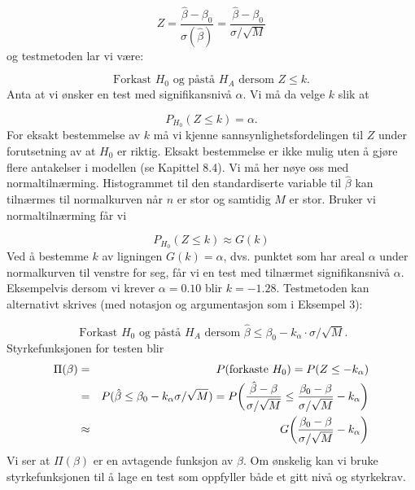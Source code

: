 \[ Z=\frac{\hat{\beta}-{\beta}_0}{\sigma (\hat{\beta})}=
              \frac{\hat{\beta}-{\beta}_0}{\sigma /\sqrt{M}}\]
og testmetoden lar vi være:

\[ \mbox{Forkast $H_0$ og påstå $H_A$ dersom $Z\le k$}. \]
Anta at vi ønsker en test med signifikansnivå $\alpha$. Vi
må da velge $k$ slik at

\[  P_{H_0}(Z\le k)=\alpha .\]
For eksakt bestemmelse av $k$ må vi kjenne
sannsynlighetsfordelingen til $Z$ under forutsetning av at $H_0$
er riktig. Eksakt bestemmelse er ikke mulig uten å gjøre
flere antakelser i modellen (se Kapittel 8.4). Vi må her
nøye oss med normaltilnærming. Histogrammet til den
standardiserte variable til $\hat\beta$ kan tilnærmes til
normalkurven når $n$ er stor og samtidig $M$ er stor. Bruker
vi normaltilnærming får vi

\[    P_{H_0}(Z\le k)\approx G(k)\]
Ved å bestemme $k$ av ligningen $G(k)=\alpha$, dvs. punktet som har areal
$\alpha$ under normalkurven til venstre for seg, får vi en
test med tilnærmet signifikansnivå $\alpha$. Eksempelvis
dersom vi krever $\alpha=0.10$ blir $k=-1.28$. Testmetoden kan alternativt 
skrives (med notasjon og argumentasjon som i Eksempel 3):

\[ \mbox{ Forkast $H_0$ og påstå $H_A$ dersom $\hat{\beta} \le
     \beta_0 - k_{\alpha} \cdot \sigma /\sqrt{M}$.} \]
\noindent
Styrkefunksjonen for testen blir
\begin{eqnarray*}
 \Pi (\beta )&=&P(\mbox{forkaste } H_0)=P(Z\le -k_{\alpha})\\
       &=&P(\hat{\beta}\le {\beta}_0  - k_{\alpha}\sigma /\sqrt M)=
     P\biggl({\hat{\beta}-\beta \over \sigma /\sqrt M} \le {{\beta}_0 -
     \beta \over \sigma /\sqrt M} - k_{\alpha}\biggr) \\
      &\approx & G\biggl( {{\beta}_0 -\beta \over \sigma /\sqrt M} - 
         k_{\alpha}\biggr)
\end{eqnarray*}
Vi ser at $\Pi (\beta)$ er en avtagende funksjon av $\beta$. Om
ønskelig kan vi bruke styrkefunksjonen til å lage en test
som oppfyller både et gitt nivå og styrkekrav.\\

